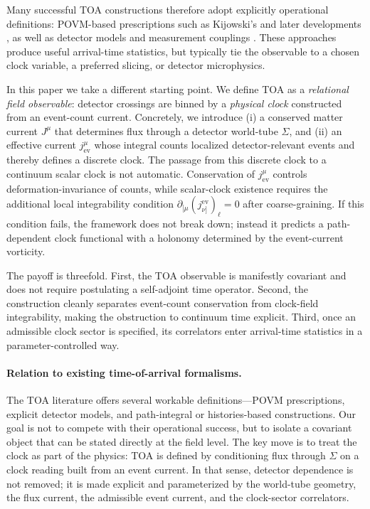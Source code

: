 \documentclass[pdflatex,sn-mathphys-num]{sn-jnl}
\theoremstyle{thmstylethree}
\theoremstyle{thmstyleone}
\theoremstyle{thmstyletwo}
\numberwithin{equation}{section}
\begin{document}
        Many successful TOA constructions therefore adopt explicitly operational definitions: POVM-based prescriptions such as Kijowski's \cite{Kijowski1974} and later developments \cite{Giannitrapani1997,Muga2008}, as well as detector models and measurement couplings \cite{ColosiOeckl2025TimeOperatorTOA}. These approaches produce useful arrival-time statistics, but typically tie the observable to a chosen clock variable, a preferred slicing, or detector microphysics.
        
        In this paper we take a different starting point. We define TOA as a \emph{relational field observable}: detector crossings are binned by a \emph{physical clock} constructed from an event-count current. Concretely, we introduce (i) a conserved matter current $J^\mu$ that determines flux through a detector world-tube $\Sigma$, and (ii) an effective current $j^\mu_{\mathrm{ev}}$ whose integral counts localized detector-relevant events and thereby defines a discrete clock. The passage from this discrete clock to a continuum scalar clock is not automatic. Conservation of $j^\mu_{\mathrm{ev}}$ controls deformation-invariance of counts, while scalar-clock existence requires the additional local integrability condition $\partial_{[\mu}(j^{\mathrm{ev}}_{\nu]})_\ell=0$ after coarse-graining. If this condition fails, the framework does not break down; instead it predicts a path-dependent clock functional with a holonomy determined by the event-current vorticity.
        
        The payoff is threefold. First, the TOA observable is manifestly covariant and does not require postulating a self-adjoint time operator. Second, the construction cleanly separates event-count conservation from clock-field integrability, making the obstruction to continuum time explicit. Third, once an admissible clock sector is specified, its correlators enter arrival-time statistics in a parameter-controlled way.
        
        \paragraph{Relation to existing time-of-arrival formalisms.}
            The TOA literature offers several workable definitions---POVM prescriptions, explicit detector models, and path-integral or histories-based constructions. Our goal is not to compete with their operational success, but to isolate a covariant object that can be stated directly at the field level. The key move is to treat the clock as part of the physics: TOA is defined by conditioning flux through $\Sigma$ on a clock reading built from an event current. In that sense, detector dependence is not removed; it is made explicit and parameterized by the world-tube geometry, the flux current, the admissible event current, and the clock-sector correlators.
        
\end{document}
